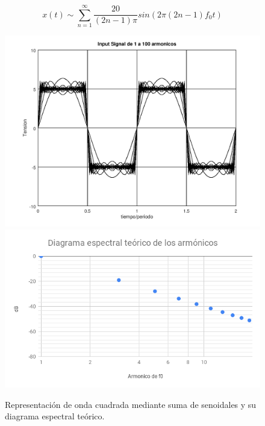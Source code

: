 \begin{equation}
x(t)\sim\sum_{n=1}^{\infty}\frac{20}{(2n-1)\pi}sin\left(2\pi(2n-1)f_{0}t\right)\label{eq:2_1}
\end{equation}

\begin{figure}[H]
\begin{centering}
\includegraphics[scale=0.35]{../Ex2/resources2/Square}\includegraphics[scale=0.35]{../Ex2/resources2/DiagEspcTeo} 
\par\end{centering}
\caption{Representación de onda cuadrada mediante suma de senoidales y su diagrama
espectral teórico.}
\label{2_2} 
\end{figure}

